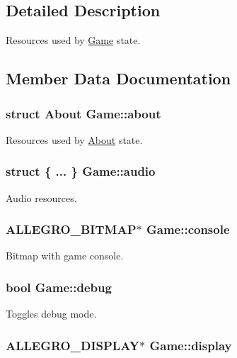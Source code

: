\subsection{Detailed Description}
Resources used by \hyperlink{structGame}{Game} state. 

\subsection{Member Data Documentation}
\hypertarget{structGame_a0f7f35de759c984c4b53c86fb0dcbd44}{
\subsubsection[{about}]{\setlength{\rightskip}{0pt plus 5cm}struct {\bf About} Game\-::about}}\label{structGame_a0f7f35de759c984c4b53c86fb0dcbd44}
Resources used by \hyperlink{structAbout}{About} state. \hypertarget{structGame_a08fa0fd8226d1c661bbdd069197fb690}{
\subsubsection[{audio}]{\setlength{\rightskip}{0pt plus 5cm}struct \{ ... \}   Game\-::audio}}\label{structGame_a08fa0fd8226d1c661bbdd069197fb690}
Audio resources. \hypertarget{structGame_aa2e3d0922374dc870a1aeabf9e3b8ae2}{
\subsubsection[{console}]{\setlength{\rightskip}{0pt plus 5cm}A\-L\-L\-E\-G\-R\-O\-\_\-\-B\-I\-T\-M\-A\-P$\ast$ Game\-::console}}\label{structGame_aa2e3d0922374dc870a1aeabf9e3b8ae2}
Bitmap with game console. \hypertarget{structGame_ad1a3eb5c2d99f8cb9c1f7eb91689af6d}{
\subsubsection[{debug}]{\setlength{\rightskip}{0pt plus 5cm}bool Game\-::debug}}\label{structGame_ad1a3eb5c2d99f8cb9c1f7eb91689af6d}
Toggles debug mode. \hypertarget{structGame_a2bf8ece79fe05b03c31f2e2ede42e5f5}{
\subsubsection[{display}]{\setlength{\rightskip}{0pt plus 5cm}A\-L\-L\-E\-G\-R\-O\-\_\-\-D\-I\-S\-P\-L\-A\-Y$\ast$ Game\-::display}}\label{structGame_a2bf8ece79fe05b03c31f2e2ede42e5f5}
